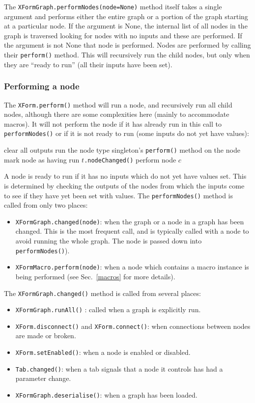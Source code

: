 The \texttt{XFormGraph.performNodes(node=None)} method itself takes a single
argument and performs either the entire graph or a portion of the graph
starting at a particular node. If the argument is None, the internal list of
all nodes in the graph is traversed looking for nodes with no inputs and these
are performed. If the argument is not None that node is performed. Nodes are
performed by calling their \texttt{perform()} method. This will recursively
run the child nodes, but only when they are ``ready to run'' (all their inputs
have been set). 

\clearpage
\subsubsection{Performing a node}
The \texttt{XForm.perform()} method will run a node, and recursively run all child nodes, although
there are some complexities here (mainly to accommodate macros). It will not perform the node if it 
has already run in this call to \texttt{performNodes()} or if it is not ready to run (some inputs do not yet have values):
\begin{algorithmic}
\STATE clear all outputs
\STATE run the node type singleton's \texttt{perform()} method on the node
\STATE mark node as having run
\STATE $t$\texttt{.nodeChanged()}
\ENDFOR
{}
\STATE perform node $c$
\ENDFOR
\ENDIF
\end{algorithmic}
A node is ready to run if it has no inputs which do not yet have values set. This is
determined by checking the outputs of the nodes from which the inputs come to see if
they have yet been set with values. The \texttt{performNodes()} method is called from only two places:
\begin{itemize}
\item \texttt{XFormGraph.changed(node)}: when the graph or a node in a graph has been changed. This is the most
frequent call, and is typically called with a node to avoid running the whole graph. The node is passed down into
\texttt{performNodes()}).
\item \texttt{XFormMacro.perform(node)}: when a node which contains a macro instance is being performed (see
Sec.~\ref{macros} for more details).
\end{itemize}
The \texttt{XFormGraph.changed()} method is called from several places:
\begin{itemize}
\item \texttt{XFormGraph.runAll()} : called when a graph is explicitly run.
\item \texttt{XForm.disconnect()} and \texttt{XForm.connect()}: when connections between nodes are made or broken.
\item \texttt{XForm.setEnabled()}: when a node is enabled or disabled.
\item \texttt{Tab.changed()}: when a tab signals that a node it controls has had a parameter change.
\item \texttt{XFormGraph.deserialise()}: when a graph has been loaded.
\end{itemize}

